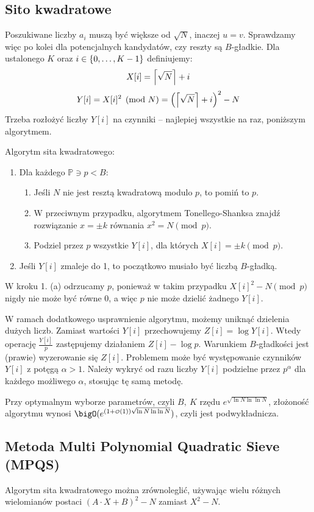 \subsection{Sito kwadratowe}
Poszukiwane liczby \( a_i \) muszą być większe od \( \sqrt{N} \), inaczej \( u = v \). Sprawdzamy więc po kolei dla potencjalnych kandydatów, czy reszty są \( B \)-gładkie.
Dla ustalonego \( K \) oraz \( i \in \set{0, \dots, K-1} \) definiujemy:
\[ X[i] = \left\lceil\sqrt{N}\right\rceil + i \]
\[ Y[i] = X[i]^2 \pmod{N} = \left(\left\lceil\sqrt{N}\right\rceil + i\right)^2 - N \]
Trzeba rozłożyć liczby \( Y[i] \) na czynniki -- najlepiej wszystkie na raz, poniższym algorytmem.
\begin{greyframe}
	Algorytm sita kwadratowego:
	\begin{enumerate}
		\item Dla każdego \( \mathbb{P} \ni p < B \):
		      \begin{enumerate}
			      \item Jeśli \( N \) nie jest resztą kwadratową modulo \( p \), to pomiń to \(p\).
			      \item W przeciwnym przypadku, algorytmem Tonellego-Shanksa znajdź rozwiązanie \( x = \pm k \) równania \( x^2 = N \pmod{p} \).
			      \item Podziel przez \( p \) wszystkie \( Y[i] \), dla których \( X[i] = \pm k \pmod{p} \).
		      \end{enumerate}
		\item Jeśli \( Y[i] \) zmaleje do 1, to początkowo musiało być liczbą \( B \)-gładką.
	\end{enumerate}
\end{greyframe}
W kroku 1. (a) odrzucamy \(p\), ponieważ w takim przypadku \(X[i]^2 - N \pmod{p}\) nigdy nie może być równe 0, a więc \(p\) nie może dzielić żadnego \(Y[i]\). 

W ramach dodatkowego usprawnienie algorytmu, możemy uniknąć dzielenia dużych liczb. Zamiast wartości \( Y[i] \) przechowujemy \( Z[i] = \log Y[i] \).
Wtedy operację \( \frac{Y[i]}{p} \) zastępujemy działaniem \( Z[i] - \log p \). Warunkiem \( B \)-gładkości jest (prawie) wyzerowanie się \( Z[i] \).
Problemem może być występowanie czynników \( Y[i] \) z potęgą \( \alpha > 1 \). Należy wykryć od razu liczby \( Y[i] \) podzielne przez \( p^{\alpha} \) dla każdego możliwego \( \alpha \), stosując tę samą metodę.

Przy optymalnym wyborze parametrów, czyli \( B, \ K \) rzędu \( e^{\sqrt{\ln N \ln\ln N}} \), złożoność algorytmu wynosi \( \bigO(e^{(1 + {\scriptscriptstyle\mathcal{O}}(1))\sqrt{\ln N \ln\ln N}}) \), czyli jest podwykładnicza.

\subsection{Metoda Multi Polynomial Quadratic Sieve (MPQS)}
Algorytm sita kwadratowego można zrównoleglić, używając wielu różnych wielomianów postaci \( (A \cdot X + B)^2 - N \) zamiast \( X^2 - N \).
